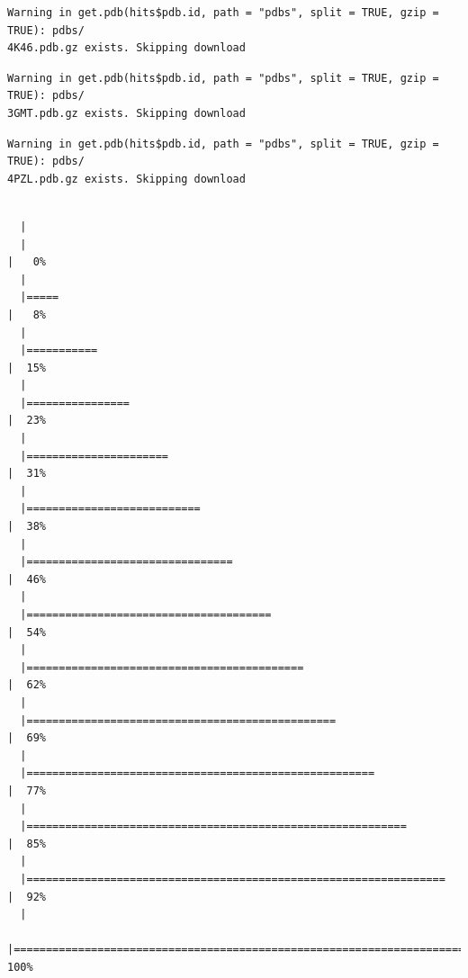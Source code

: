 \documentclass[
  letterpaper,
  DIV=11,
  numbers=noendperiod]{scrartcl}
\begin{document}
\begin{verbatim}
Warning in get.pdb(hits$pdb.id, path = "pdbs", split = TRUE, gzip = TRUE): pdbs/
4K46.pdb.gz exists. Skipping download
\end{verbatim}

\begin{verbatim}
Warning in get.pdb(hits$pdb.id, path = "pdbs", split = TRUE, gzip = TRUE): pdbs/
3GMT.pdb.gz exists. Skipping download
\end{verbatim}

\begin{verbatim}
Warning in get.pdb(hits$pdb.id, path = "pdbs", split = TRUE, gzip = TRUE): pdbs/
4PZL.pdb.gz exists. Skipping download
\end{verbatim}

\begin{verbatim}

  |                                                                            
  |                                                                      |   0%
  |                                                                            
  |=====                                                                 |   8%
  |                                                                            
  |===========                                                           |  15%
  |                                                                            
  |================                                                      |  23%
  |                                                                            
  |======================                                                |  31%
  |                                                                            
  |===========================                                           |  38%
  |                                                                            
  |================================                                      |  46%
  |                                                                            
  |======================================                                |  54%
  |                                                                            
  |===========================================                           |  62%
  |                                                                            
  |================================================                      |  69%
  |                                                                            
  |======================================================                |  77%
  |                                                                            
  |===========================================================           |  85%
  |                                                                            
  |=================================================================     |  92%
  |                                                                            
  |======================================================================| 100%
\end{verbatim}
\end{document}
